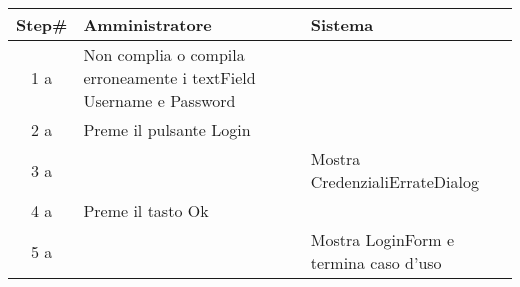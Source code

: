 \documentclass[a4paper]{article}
\begin{document}
\begin{table}[H]
\begin{tabularx}{\textwidth}{|c|X|X|}
            Step\# & Amministratore & Sistema \\
            \hline
             1 a &  Non complia o compila erroneamente i textField Username e Password& \\
             \hline
             2 a & Preme il pulsante Login & \\
             \hline
             3 a & & Mostra CredenzialiErrateDialog \\
             \hline
             4 a & Preme il tasto Ok&  \\
             \hline
             5 a & & Mostra LoginForm e termina caso d'uso\\
             \hline        
        \end{tabularx} 
\end{table}
\end{document}
